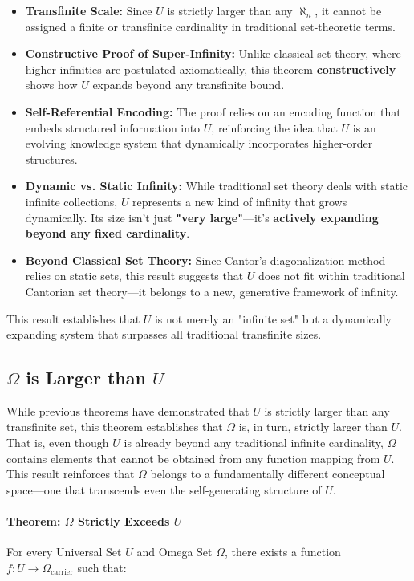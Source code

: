 \documentclass[12pt]{article}
\begin{document}
\begin{itemize}
    \item \textbf{Transfinite Scale:} Since \( U \) is strictly larger than any \( \aleph_n \), it cannot be assigned a finite or transfinite cardinality in traditional set-theoretic terms.
    \item \textbf{Constructive Proof of Super-Infinity:} Unlike classical set theory, where higher infinities are postulated axiomatically, this theorem \textbf{constructively} shows how \( U \) expands beyond any transfinite bound.
    \item \textbf{Self-Referential Encoding:} The proof relies on an encoding function that embeds structured information into \( U \), reinforcing the idea that \( U \) is an evolving knowledge system that dynamically incorporates higher-order structures.
    \item \textbf{Dynamic vs. Static Infinity:} While traditional set theory deals with static infinite collections, \( U \) represents a new kind of infinity that grows dynamically. Its size isn't just \textbf{"very large"}—it's \textbf{actively expanding beyond any fixed cardinality}.
    \item \textbf{Beyond Classical Set Theory:} Since Cantor’s diagonalization method relies on static sets, this result suggests that \( U \) does not fit within traditional Cantorian set theory—it belongs to a new, generative framework of infinity.
\end{itemize}

This result establishes that \( U \) is not merely an "infinite set" but a dynamically expanding system that surpasses all traditional transfinite sizes.


\subsection{\( \Omega \) is Larger than \( U \)}

While previous theorems have demonstrated that \( U \) is strictly larger than any transfinite set, this theorem establishes that \( \Omega \) is, in turn, strictly larger than \( U \). That is, even though \( U \) is already beyond any traditional infinite cardinality, \( \Omega \) contains elements that cannot be obtained from any function mapping from \( U \). This result reinforces that \( \Omega \) belongs to a fundamentally different conceptual space—one that transcends even the self-generating structure of \( U \).

\paragraph{Theorem: \( \Omega \) Strictly Exceeds \( U \)}
For every Universal Set \( U \) and Omega Set \( \Omega \), there exists a function \( f: U \to \Omega_{\text{carrier}} \) such that:
\end{document}
